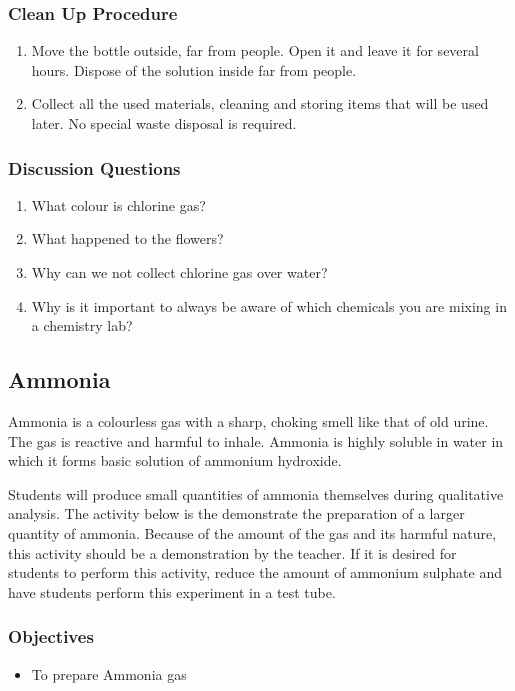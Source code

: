 \subsubsection*{Clean Up Procedure}
\begin{enumerate}
\item{Move the bottle outside, far from people. Open it and leave it for several hours. Dispose of the solution inside far from people.}
\item{Collect all the used materials, cleaning and storing items that will be used later. No special waste disposal is required.}
\end{enumerate}

\subsubsection*{Discussion Questions}
\begin{enumerate}
\item{What colour is chlorine gas?}
\item{What happened to the flowers?}
\item{Why can we not collect chlorine gas over water?}
\item{Why is it important to always be aware of which chemicals you are mixing in a chemistry lab?}
\end{enumerate}

\subsection{Ammonia}

Ammonia is a colourless gas with a sharp, choking smell like that of old urine. The gas is reactive and harmful to inhale. Ammonia is highly soluble in water in which it forms basic solution of ammonium hydroxide.

Students will produce small quantities of ammonia themselves during qualitative analysis. The activity below is the demonstrate the preparation of a larger quantity of ammonia. Because of the amount of the gas and its harmful nature, this activity should be a demonstration by the teacher. If it is desired for students to perform this activity, reduce the amount of ammonium sulphate and have students perform this experiment in a test tube.

\subsubsection*{Objectives}
\begin{itemize}
\item{To prepare Ammonia gas}
\end{itemize}

